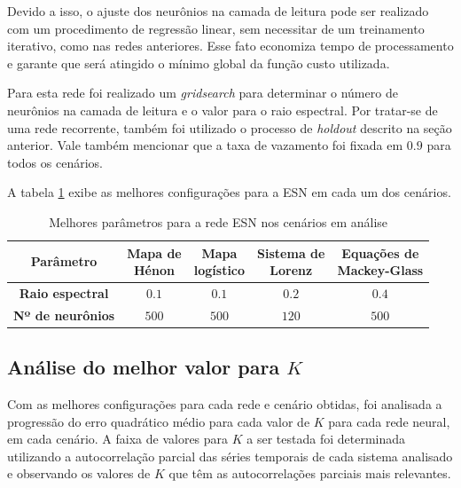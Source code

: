 \documentclass{article}
\begin{document}
Devido a isso, o ajuste dos neurônios na camada de leitura pode ser realizado com um procedimento de regressão linear, sem necessitar de um treinamento iterativo, como nas redes anteriores. Esse fato economiza tempo de processamento e garante que será atingido o mínimo global da função custo utilizada.

Para esta rede foi realizado um \textit{gridsearch} para determinar o número de neurônios na camada de leitura e o valor para o raio espectral. Por tratar-se de uma rede recorrente, também foi utilizado o processo de \textit{holdout} descrito na seção anterior. Vale também mencionar que a taxa de vazamento foi fixada em $0.9$ para todos os cenários.

A tabela \ref{tab:esn} exibe as melhores configurações para a ESN em cada um dos cenários.
\begin{table}[H]
\begin{center}
\begin{tabular}{c c c c c}
  \textbf{Parâmetro} & \pbox{0.7cm}{\centering \textbf{Mapa de\newline Hénon}} & \pbox{0.6cm}{\centering \textbf{Mapa\newline logístico}} & \pbox{1.0cm}{\centering \textbf{Sistema de\newline Lorenz}} & \pbox{1.1cm}{\centering \textbf{Equações de\newline Mackey-Glass}}\\
 \hline
 \addlinespace
 {\centering \textbf{Raio espectral}} & $0.1$ & $0.1$ & $0.2$ & $0.4$\\  
  \addlinespace
 {\centering \textbf{Nº de neurônios}} & $500$ & $500$ & $120$ & $500$\\ 
\end{tabular}
\caption{Melhores parâmetros para a rede ESN nos cenários em análise}
\label{tab:esn}
\end{center}
\end{table}

\subsection{Análise do melhor valor para $K$}

Com as melhores configurações para cada rede e cenário obtidas, foi analisada a progressão do erro quadrático médio para cada valor de $K$ para cada rede neural, em cada cenário. A faixa de valores para $K$ a ser testada foi determinada utilizando a autocorrelação parcial das séries temporais de cada sistema analisado e observando os valores de $K$ que têm as autocorrelações parciais mais relevantes.
\end{document}
